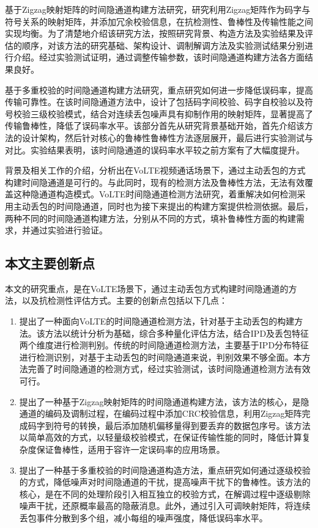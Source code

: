 基于Zigzag映射矩阵的时间隐通道构建方法研究，研究利用Zigzag矩阵作为码字与符号关系的映射矩阵，并添加冗余校验信息，在抗检测性、鲁棒性及传输性能之间实现均衡。为了清楚地介绍该研究方法，按照研究背景、构造方法及实验结果及评估的顺序，对该方法的研究基础、架构设计、调制解调方法及实验测试结果分别进行介绍。经过实验测试证明，通过调整传输参数，该时间隐通道构建方法各方面结果良好。

基于多重校验的时间隐通道构建方法研究，重点研究如何进一步降低误码率，提高传输可靠性。在该时间隐通道方法中，设计了包括码字间校验、码字自校验以及符号校验三级校验模式，结合对连续丢包噪声具有抑制作用的映射矩阵，显著提高了传输鲁棒性，降低了误码率水平。该部分首先从研究背景基础开始，首先介绍该方法的设计架构，然后针对核心的鲁棒性鲁棒性方法逐层展开，最后进行实验测试与对比。实验结果表明，该时间隐通道的误码率水平较之前方案有了大幅度提升。

背景及相关工作的介绍，分析出在VoLTE视频通话场景下，通过主动丢包的方式构建时间隐通道是可行的。与此同时，现有的检测方法及鲁棒性方法，无法有效覆盖这种隐通道构造模式。VoLTE时间隐通道检测方法研究，着重解决如何检测采用主动丢包的时间隐通道，同时也为接下来提出的构建方案提供检测依据。最后，两种不同的时间隐通道构建方法，分别从不同的方式，填补鲁棒性方面的构建需求，并通过实验进行验证。

\subsection{本文主要创新点}
\label{sec:intro:work:inno}

本文的研究重点，是在VoLTE场景下，通过主动丢包方式构建时间隐通道的方法，以及抗检测性评估方式。主要的创新点包括以下几点：

\begin{enumerate}
    \item 提出了一种面向VoLTE的时间隐通道检测方法，针对基于主动丢包的构建方法。该方法以统计分析为基础，综合多种量化评估方法，结合IPD及丢包特征两个维度进行检测判别。传统的时间隐通道检测方法，主要基于IPD分布特征进行检测识别，对基于主动丢包的时间隐通道来说，判别效果不够全面。本方法完善了时间隐通道的检测方式，经过实验测试，该时间隐通道检测方法有效可行。
    \item 提出了一种基于Zigzag映射矩阵的时间隐通道构建方法，该方法的核心，是隐通道的编码及调制过程，在编码过程中添加CRC校验信息，利用Zigzag矩阵完成码字到符号的转换，最后添加随机偏移量得到要丢弃的数据包序号。该方法以简单高效的方式，以轻量级校验模式，在保证传输性能的同时，降低计算复杂度保证鲁棒性，适用于容许一定误码率的应用场景。
    \item 提出了一种基于多重校验的时间隐通道构造方法，重点研究如何通过逐级校验的方式，降低噪声对时间隐通道的干扰，提高噪声干扰下的鲁棒性。该方法的核心，是在不同的处理阶段引入相互独立的校验方式，在解调过程中逐级剔除噪声干扰，还原概率最高的隐蔽消息。此外，通过引入可调映射矩阵，将连续丢包事件分散到多个组，减小每组的噪声强度，降低误码率水平。
\end{enumerate}

